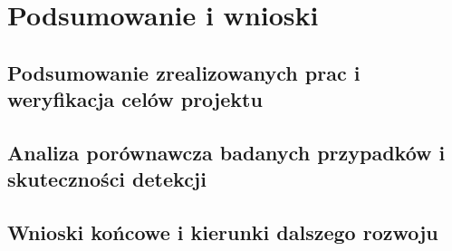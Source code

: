 \chapter{Podsumowanie i wnioski}\label{ch:podsumowanie}

\section{Podsumowanie zrealizowanych prac i weryfikacja celów projektu}\label{sec:podsumowanie_celow}

\section{Analiza porównawcza badanych przypadków i skuteczności detekcji}\label{sec:analiza_porownawcza}

\section{Wnioski końcowe i kierunki dalszego rozwoju}\label{sec:wnioski_kierunki}

